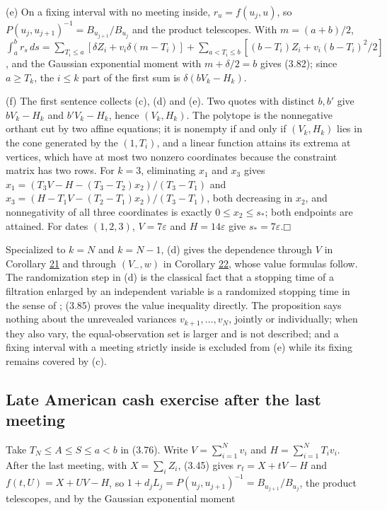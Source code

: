 \documentclass[11pt]{article}
\providecommand{\square}{\mdlgwhtsquare}
\begin{document}
(e) On a fixing interval with no meeting inside, \(r_u = f(u_j, u)\), so \(P(u_j, u_{j+1})^{-1} = B_{u_{j+1}} / B_{u_j}\) and the product telescopes. With \(m = (a + b) / 2\), \(\int_a^b r_s\,ds = \sum_{T_i \le a} [\delta Z_i + v_i \delta (m - T_i)] + \sum_{a < T_i \le b} [(b - T_i) Z_i + v_i (b - T_i)^2 / 2]\), and the Gaussian exponential moment with \(m + \delta / 2 = b\) gives (3.82); since \(a \ge T_k\), the \(i \le k\) part of the first sum is \(\delta (b V_k - H_k)\).

(f) The first sentence collects (c), (d) and (e). Two quotes with distinct \(b, b'\) give \(b V_k - H_k\) and \(b' V_k - H_k\), hence \((V_k, H_k)\). The polytope is the nonnegative orthant cut by two affine equations; it is nonempty if and only if \((V_k, H_k)\) lies in the cone generated by the \((1, T_i)\), and a linear function attains its extrema at vertices, which have at most two nonzero coordinates because the constraint matrix has two rows. For \(k = 3\), eliminating \(x_1\) and \(x_3\) gives \(x_1 = (T_3 V - H - (T_3 - T_2) x_2) / (T_3 - T_1)\) and \(x_3 = (H - T_1 V - (T_2 - T_1) x_2) / (T_3 - T_1)\), both decreasing in \(x_2\), and nonnegativity of all three coordinates is exactly \(0 \le x_2 \le s_*\); both endpoints are attained. For dates \((1, 2, 3)\), \(V = 7\varepsilon\) and \(H = 14\varepsilon\) give \(s_* = 7\varepsilon\).\hfill$\square$

Specialized to \(k = N\) and \(k = N - 1\), (d) gives the dependence through \(V\) in Corollary \hyperref[res:Corollary-21]{21} and through \((V_-, w)\) in Corollary \hyperref[res:Corollary-22]{22}, whose value formulas follow. The randomization step in (d) is the classical fact that a stopping time of a filtration enlarged by an independent variable is a randomized stopping time in the sense of \cite{baxter1977compactness}; (3.85) proves the value inequality directly. The proposition says nothing about the unrevealed variances \(v_{k+1}, \dots, v_N\), jointly or individually; when they also vary, the equal-observation set is larger and is not described; and a fixing interval with a meeting strictly inside is excluded from (e) while its fixing remains covered by (c).

\subsection{Late American cash exercise after the last meeting}\label{sec:3.18}

Take \(T_N \le A \le S \le a < b\) in (3.76). Write \(V = \sum_{i=1}^N v_i\) and \(H = \sum_{i=1}^N T_i v_i\). After the last meeting, with \(X = \sum_i Z_i\), (3.45) gives \(r_t = X + tV - H\) and \(f(t, U) = X + UV - H\), so \(1 + d_j L_j = P(u_j, u_{j+1})^{-1} = B_{u_{j+1}} / B_{u_j}\), the product telescopes, and by the Gaussian exponential moment
\end{document}
